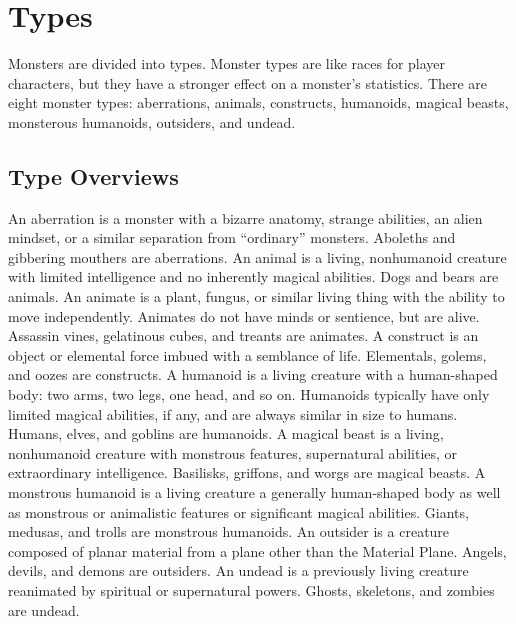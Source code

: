 \chapter{Types}\label{Types}

Monsters are divided into types.
Monster types are like races for player characters, but they have a stronger effect on a monster's statistics.
There are eight monster types: aberrations, animals, constructs, humanoids, magical beasts, monsterous humanoids, outsiders, and undead.

\section{Type Overviews}

     An aberration is a monster with a bizarre anatomy, strange abilities, an alien mindset, or a similar separation from ``ordinary'' monsters.
    Aboleths and gibbering mouthers are aberrations.
     An animal is a living, nonhumanoid creature with limited intelligence and no inherently magical abilities.
    Dogs and bears are animals.
     An animate is a plant, fungus, or similar living thing with the ability to move independently.
    Animates do not have minds or sentience, but are alive.
    Assassin vines, gelatinous cubes, and treants are animates.
     A construct is an object or elemental force imbued with a semblance of life.
    Elementals, golems, and oozes are constructs.
     A humanoid is a living creature with a human-shaped body: two arms, two legs, one head, and so on.
    Humanoids typically have only limited magical abilities, if any, and are always similar in size to humans.
    Humans, elves, and goblins are humanoids.
     A magical beast is a living, nonhumanoid creature with monstrous features, supernatural abilities, or extraordinary intelligence.
    Basilisks, griffons, and worgs are magical beasts.
     A monstrous humanoid is a living creature a generally human-shaped body as well as monstrous or animalistic features or significant magical abilities.
    Giants, medusas, and trolls are monstrous humanoids.
     An outsider is a creature composed of planar material from a plane other than the Material Plane.
    Angels, devils, and demons are outsiders.
     An undead is a previously living creature reanimated by spiritual or supernatural powers.
    Ghosts, skeletons, and zombies are undead.

